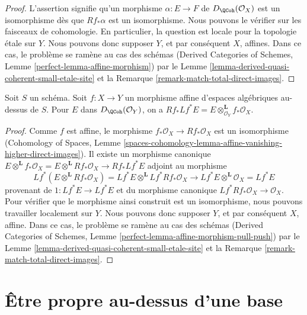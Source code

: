 \begin{proof}
L'assertion signifie qu'un morphisme $\alpha : E \to F$ de
$D_\QCoh(\mathcal{O}_X)$ est un isomorphisme dès que
$Rf_*\alpha$ est un isomorphisme. Nous pouvons le vérifier sur les faisceaux de cohomologie.
En particulier, la question est locale pour la topologie étale sur $Y$. Nous pouvons donc supposer
$Y$, et par conséquent $X$, affines. Dans ce cas, le problème se ramène au
cas des schémas
(Derived Categories of Schemes, Lemme \ref{perfect-lemma-affine-morphism})
par le Lemme \ref{lemma-derived-quasi-coherent-small-etale-site} et la
Remarque \ref{remark-match-total-direct-images}.
\end{proof}

\begin{lemma}
\label{lemma-affine-morphism-pull-push}
Soit $S$ un schéma. Soit $f : X \to Y$ un morphisme affine d'espaces algébriques
au-dessus de $S$. Pour $E$ dans $D_\QCoh(\mathcal{O}_Y)$, on a
$Rf_* Lf^* E = E \otimes^\mathbf{L}_{\mathcal{O}_Y} f_*\mathcal{O}_X$.
\end{lemma}

\begin{proof}
Comme $f$ est affine, le morphisme $f_*\mathcal{O}_X \to Rf_*\mathcal{O}_X$
est un isomorphisme (Cohomology of Spaces, Lemme
\ref{spaces-cohomology-lemma-affine-vanishing-higher-direct-images}).
Il existe un morphisme canonique
$E \otimes^\mathbf{L} f_*\mathcal{O}_X =
E \otimes^\mathbf{L} Rf_*\mathcal{O}_X \to Rf_* Lf^* E$
adjoint au morphisme
$$
Lf^*(E \otimes^\mathbf{L} Rf_*\mathcal{O}_X) =
Lf^*E \otimes^\mathbf{L} Lf^*Rf_*\mathcal{O}_X \longrightarrow
Lf^* E \otimes^\mathbf{L} \mathcal{O}_X = Lf^* E
$$
provenant de $1 : Lf^*E \to Lf^*E$ et du morphisme canonique
$Lf^*Rf_*\mathcal{O}_X \to \mathcal{O}_X$. Pour vérifier que le morphisme ainsi construit
est un isomorphisme, nous pouvons travailler localement sur $Y$. Nous pouvons donc supposer
$Y$, et par conséquent $X$, affine. Dans ce cas, le problème se ramène au
cas des schémas
(Derived Categories of Schemes, Lemme
\ref{perfect-lemma-affine-morphism-pull-push})
par le Lemme \ref{lemma-derived-quasi-coherent-small-etale-site} et la
Remarque \ref{remark-match-total-direct-images}.
\end{proof}








\section{Être propre au-dessus d'une base}
\label{section-proper-over-base}


